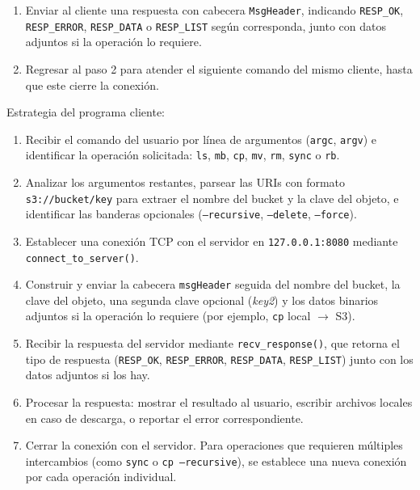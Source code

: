 \documentclass[12pt, letterpaper]{article}
\begin{document}
\begin{enumerate}
\begin{itemize}
              múltiples objetos vía \texttt{CMD\_PUT}.
        \item \texttt{CMD\_RB}: eliminar un bucket, con verificación de 
              que esté vacío a menos que se use el flag \texttt{--force}.
    \end{itemize}
    \item Enviar al cliente una respuesta con cabecera \texttt{MsgHeader}, 
          indicando \texttt{RESP\_OK}, \texttt{RESP\_ERROR}, 
          \texttt{RESP\_DATA} o \texttt{RESP\_LIST} según corresponda, 
          junto con datos adjuntos si la operación lo requiere.
    \item Regresar al paso 2 para atender el siguiente comando del mismo 
          cliente, hasta que este cierre la conexión.
\end{enumerate}
Estrategia del programa cliente:
\begin{enumerate}
    \item Recibir el comando del usuario por línea de argumentos 
          (\texttt{argc}, \texttt{argv}) e identificar la operación 
          solicitada: \texttt{ls}, \texttt{mb}, \texttt{cp}, \texttt{mv}, 
          \texttt{rm}, \texttt{sync} o \texttt{rb}.
    \item Analizar los argumentos restantes, parsear las URIs con formato 
          \texttt{s3://bucket/key} para extraer el nombre del bucket y la 
          clave del objeto, e identificar las banderas opcionales 
          (\texttt{--recursive}, \texttt{--delete}, \texttt{--force}).
    \item Establecer una conexión TCP con el servidor en 
          \texttt{127.0.0.1:8080} mediante \\ \texttt{connect\_to\_server()}.
    \item Construir y enviar la cabecera \texttt{msgHeader} seguida del 
          nombre del bucket, la clave del objeto, una segunda clave 
          opcional (\textit{key2}) y los datos binarios adjuntos si la 
          operación lo requiere (por ejemplo, \texttt{cp} local $\to$ S3).
    \item Recibir la respuesta del servidor mediante 
          \texttt{recv\_response()}, que retorna el tipo de respuesta 
          (\texttt{RESP\_OK}, \texttt{RESP\_ERROR}, \texttt{RESP\_DATA}, 
          \texttt{RESP\_LIST}) junto con los datos adjuntos si los hay.
    \item Procesar la respuesta: mostrar el resultado al usuario, escribir 
          archivos locales en caso de descarga, o reportar el error 
          correspondiente.
    \item Cerrar la conexión con el servidor. Para operaciones que 
          requieren múltiples intercambios (como \texttt{sync} o 
          \texttt{cp --recursive}), se establece una nueva conexión por 
          cada operación individual.
\end{enumerate}
\end{document}
